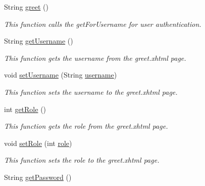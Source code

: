 \begin{DoxyCompactItemize}
\item 
String \hyperlink{classorg_1_1jboss_1_1as_1_1quickstarts_1_1greeter_1_1web_1_1_greet_controller_ad250b92d5b9e2319d8b8687bfdb17f61}{greet} ()
\begin{DoxyCompactList}\small\item\em This function calls the get\+For\+Username for user authentication. \end{DoxyCompactList}\item 
String \hyperlink{classorg_1_1jboss_1_1as_1_1quickstarts_1_1greeter_1_1web_1_1_greet_controller_aa7284bc767d83154a697bd2cc42deff4}{get\+Username} ()
\begin{DoxyCompactList}\small\item\em This function gets the username from the greet.\+xhtml page. \end{DoxyCompactList}\item 
void \hyperlink{classorg_1_1jboss_1_1as_1_1quickstarts_1_1greeter_1_1web_1_1_greet_controller_a08ca954ccd588141511ea338f1f59274}{set\+Username} (String \hyperlink{classorg_1_1jboss_1_1as_1_1quickstarts_1_1greeter_1_1web_1_1_greet_controller_a3d325f4fda39c4393e9a3ae184de7b42}{username})
\begin{DoxyCompactList}\small\item\em This function sets the username to the greet.\+xhtml page. \end{DoxyCompactList}\item 
int \hyperlink{classorg_1_1jboss_1_1as_1_1quickstarts_1_1greeter_1_1web_1_1_greet_controller_ad53e5e1baef170e9bdbb4c1cb71b012b}{get\+Role} ()
\begin{DoxyCompactList}\small\item\em This function gets the role from the greet.\+xhtml page. \end{DoxyCompactList}\item 
void \hyperlink{classorg_1_1jboss_1_1as_1_1quickstarts_1_1greeter_1_1web_1_1_greet_controller_a7750cb37b24e477fbf23e539cb823830}{set\+Role} (int \hyperlink{classorg_1_1jboss_1_1as_1_1quickstarts_1_1greeter_1_1web_1_1_greet_controller_ab69c435014ea3d9eacb77c7bffae0cb0}{role})
\begin{DoxyCompactList}\small\item\em This function sets the role to the greet.\+xhtml page. \end{DoxyCompactList}\item 
String \hyperlink{classorg_1_1jboss_1_1as_1_1quickstarts_1_1greeter_1_1web_1_1_greet_controller_a18f78f8d62724c4c10391f1db2e62fab}{get\+Password} ()

\end{DoxyCompactItemize}
